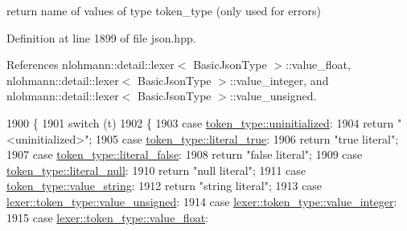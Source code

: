 return name of values of type token\+\_\+type (only used for errors) 



Definition at line 1899 of file json.\+hpp.



References nlohmann\+::detail\+::lexer$<$ Basic\+Json\+Type $>$\+::value\+\_\+float, nlohmann\+::detail\+::lexer$<$ Basic\+Json\+Type $>$\+::value\+\_\+integer, and nlohmann\+::detail\+::lexer$<$ Basic\+Json\+Type $>$\+::value\+\_\+unsigned.


\begin{DoxyCode}
1900     \{
1901         \textcolor{keywordflow}{switch} (t)
1902         \{
1903             \textcolor{keywordflow}{case} \hyperlink{classnlohmann_1_1detail_1_1lexer_a3f313cdbe187cababfc5e06f0b69b098a42dd1a73d072bb6bf3f494f22b15db8e}{token\_type::uninitialized}:
1904                 \textcolor{keywordflow}{return} \textcolor{stringliteral}{"<uninitialized>"};
1905             \textcolor{keywordflow}{case} \hyperlink{classnlohmann_1_1detail_1_1lexer_a3f313cdbe187cababfc5e06f0b69b098a85cc1a37b0aaa52de40e72f0ed4e0c0d}{token\_type::literal\_true}:
1906                 \textcolor{keywordflow}{return} \textcolor{stringliteral}{"true literal"};
1907             \textcolor{keywordflow}{case} \hyperlink{classnlohmann_1_1detail_1_1lexer_a3f313cdbe187cababfc5e06f0b69b098afab1694b1b3937a079f4625fe0b6108b}{token\_type::literal\_false}:
1908                 \textcolor{keywordflow}{return} \textcolor{stringliteral}{"false literal"};
1909             \textcolor{keywordflow}{case} \hyperlink{classnlohmann_1_1detail_1_1lexer_a3f313cdbe187cababfc5e06f0b69b098ab7ae4c0e46d86f884677768160b26e9e}{token\_type::literal\_null}:
1910                 \textcolor{keywordflow}{return} \textcolor{stringliteral}{"null literal"};
1911             \textcolor{keywordflow}{case} \hyperlink{classnlohmann_1_1detail_1_1lexer_a3f313cdbe187cababfc5e06f0b69b098a2b490e8bf366b4cbe3ebd99b26ce15ce}{token\_type::value\_string}:
1912                 \textcolor{keywordflow}{return} \textcolor{stringliteral}{"string literal"};
1913             \textcolor{keywordflow}{case} \hyperlink{classnlohmann_1_1detail_1_1lexer_a3f313cdbe187cababfc5e06f0b69b098aaf1f040fcd2f674d2e5893d7a731078f}{lexer::token\_type::value\_unsigned}:
1914             \textcolor{keywordflow}{case} \hyperlink{classnlohmann_1_1detail_1_1lexer_a3f313cdbe187cababfc5e06f0b69b098a5064b6655d88a50ae16665cf7751c0ee}{lexer::token\_type::value\_integer}:
1915             \textcolor{keywordflow}{case} \hyperlink{classnlohmann_1_1detail_1_1lexer_a3f313cdbe187cababfc5e06f0b69b098a0d2671a6f81efb91e77f6ac3bdb11443}{lexer::token\_type::value\_float}:

\end{DoxyCode}
